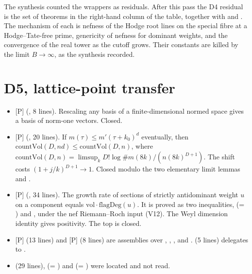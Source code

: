 \documentclass[11pt]{article}
\newcommand{\mP}{\textsf{[P]}}
\theoremstyle{remark}
\begin{document}
The synthesis counted the wrappers as residuals. After this pass the D4 residual is the set of theorems in the right-hand column of the table, together with  and . The mechanism of each is nefness of the Hodge root lines on the special fibre at a Hodge--Tate-free prime, genericity of nefness for dominant weights, and the convergence of the real tower as the cutoff grows. Their constants are killed by the limit $B\to\infty$, as the synthesis recorded.

\section{D5, lattice-point transfer}\label{sec:d5}

\begin{itemize}[nosep]
\item \mP{}  (, 8 lines). Rescaling any basis of a finite-dimensional normed space gives a basis of norm-one vectors. Closed.
\item \mP{}  (, 20 lines). If $m(\tau)\le m'(\tau+k_0)^d$ eventually, then $\mathrm{countVol}(D,nd)\le\mathrm{countVol}(D,n)$, where $\mathrm{countVol}(D,n)=\limsup_k D!\log\#m(8k)/(n(8k)^{D+1})$. The shift costs $(1+j/k)^{D+1}\to1$. Closed modulo the two elementary limit lemmas  and .
\item \mP{}  (, 34 lines). The growth rate of sections of strictly antidominant weight $u$ on a component equals $\mathrm{vol}\cdot\mathrm{flagDeg}(u)$. It is proved as two inequalities,  (= ) and , under the nef Riemann--Roch input  (V12). The Weyl dimension identity  gives positivity. The top is closed.
\item \mP{}  (13 lines) and \mP{}  (8 lines) are assemblies over , , ,  and .  (5 lines) delegates to .
\item {} (29 lines),  (= ) and  (= ) were located and not read.
\end{itemize}
\end{document}
